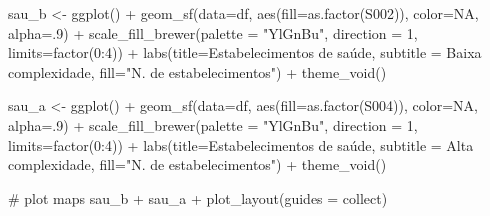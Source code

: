 \documentclass[
  letterpaper,
  DIV=11,
  numbers=noendperiod]{scrreprt}
\newenvironment{Shaded}{\begin{snugshade}}{\end{snugshade}}
\newcommand{\AttributeTok}[1]{\textcolor[rgb]{0.40,0.45,0.13}{#1}}
\newcommand{\CommentTok}[1]{\textcolor[rgb]{0.37,0.37,0.37}{#1}}
\newcommand{\ConstantTok}[1]{\textcolor[rgb]{0.56,0.35,0.01}{#1}}
\newcommand{\DecValTok}[1]{\textcolor[rgb]{0.68,0.00,0.00}{#1}}
\newcommand{\FunctionTok}[1]{\textcolor[rgb]{0.28,0.35,0.67}{#1}}
\newcommand{\NormalTok}[1]{\textcolor[rgb]{0.00,0.23,0.31}{#1}}
\newcommand{\OtherTok}[1]{\textcolor[rgb]{0.00,0.23,0.31}{#1}}
\newcommand{\SpecialCharTok}[1]{\textcolor[rgb]{0.37,0.37,0.37}{#1}}
\newcommand{\StringTok}[1]{\textcolor[rgb]{0.13,0.47,0.30}{#1}}
\begin{document}
\begin{Shaded}
\begin{Highlighting}[]
\NormalTok{sau\_b }\OtherTok{\textless{}{-}} \FunctionTok{ggplot}\NormalTok{() }\SpecialCharTok{+}
          \FunctionTok{geom\_sf}\NormalTok{(}\AttributeTok{data=}\NormalTok{df, }\FunctionTok{aes}\NormalTok{(}\AttributeTok{fill=}\FunctionTok{as.factor}\NormalTok{(S002)), }\AttributeTok{color=}\ConstantTok{NA}\NormalTok{, }\AttributeTok{alpha=}\NormalTok{.}\DecValTok{9}\NormalTok{) }\SpecialCharTok{+}
          \FunctionTok{scale\_fill\_brewer}\NormalTok{(}\AttributeTok{palette =} \StringTok{"YlGnBu"}\NormalTok{, }\AttributeTok{direction =} \DecValTok{1}\NormalTok{, }\AttributeTok{limits=}\FunctionTok{factor}\NormalTok{(}\DecValTok{0}\SpecialCharTok{:}\DecValTok{4}\NormalTok{)) }\SpecialCharTok{+}
          \FunctionTok{labs}\NormalTok{(}\AttributeTok{title=}\StringTok{\textquotesingle{}Estabelecimentos de saúde\textquotesingle{}}\NormalTok{, }\AttributeTok{subtitle =} \StringTok{\textquotesingle{}Baixa complexidade\textquotesingle{}}\NormalTok{,}
               \AttributeTok{fill=}\StringTok{"N. de estabelecimentos"}\NormalTok{) }\SpecialCharTok{+}
          \FunctionTok{theme\_void}\NormalTok{()}

\NormalTok{sau\_a }\OtherTok{\textless{}{-}} \FunctionTok{ggplot}\NormalTok{() }\SpecialCharTok{+}
          \FunctionTok{geom\_sf}\NormalTok{(}\AttributeTok{data=}\NormalTok{df, }\FunctionTok{aes}\NormalTok{(}\AttributeTok{fill=}\FunctionTok{as.factor}\NormalTok{(S004)), }\AttributeTok{color=}\ConstantTok{NA}\NormalTok{, }\AttributeTok{alpha=}\NormalTok{.}\DecValTok{9}\NormalTok{) }\SpecialCharTok{+}
          \FunctionTok{scale\_fill\_brewer}\NormalTok{(}\AttributeTok{palette =} \StringTok{"YlGnBu"}\NormalTok{, }\AttributeTok{direction =} \DecValTok{1}\NormalTok{, }\AttributeTok{limits=}\FunctionTok{factor}\NormalTok{(}\DecValTok{0}\SpecialCharTok{:}\DecValTok{4}\NormalTok{)) }\SpecialCharTok{+}
          \FunctionTok{labs}\NormalTok{(}\AttributeTok{title=}\StringTok{\textquotesingle{}Estabelecimentos de saúde\textquotesingle{}}\NormalTok{, }\AttributeTok{subtitle =} \StringTok{\textquotesingle{}Alta complexidade\textquotesingle{}}\NormalTok{,}
               \AttributeTok{fill=}\StringTok{"N. de estabelecimentos"}\NormalTok{) }\SpecialCharTok{+}
          \FunctionTok{theme\_void}\NormalTok{()}

\CommentTok{\# plot maps}
\NormalTok{sau\_b  }\SpecialCharTok{+}\NormalTok{ sau\_a  }\SpecialCharTok{+} \FunctionTok{plot\_layout}\NormalTok{(}\AttributeTok{guides =} \StringTok{\textquotesingle{}collect\textquotesingle{}}\NormalTok{)}
\end{Highlighting}
\end{Shaded}
\end{document}
